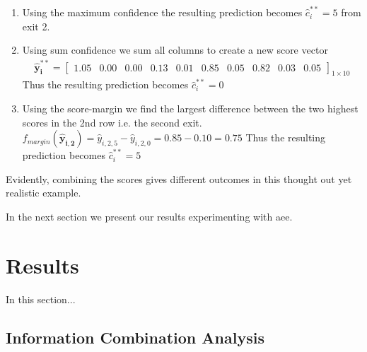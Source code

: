 {\begin{enumerate}
		\item 	Using the maximum confidence the resulting prediction becomes $ \hat{c}^{**}_{i} =  5$ from exit 2.
		\item 	Using sum confidence we sum all columns to create a new score vector
		\begin{align*}
		\bm{\hat{y}^{**}_{i}} = 
		\begin{bmatrix}
		1.05 & 0.00 & 0.00 & 0.13 & 0.01 & 0.85 & 0.05 & 0.82 & 0.03 & 0.05
		\end{bmatrix}_{1 \times 10}
		\end{align*}
		Thus the resulting prediction becomes $ \hat{c}^{**}_{i} = 0$
		\item Using the score-margin we find the largest difference between the two highest scores in the 2nd row i.e. the second exit. $ f_{margin}\left(\bm{\hat{y}_{i,2}}\right) = \hat{y}_{i,2,5} - \hat{y}_{i,2,0} = 0.85 - 0.10 =0.75 $ Thus the resulting prediction becomes $ \hat{c}^{**}_i = 5$
	\end{enumerate}
	Evidently, combining the scores gives different outcomes in this thought out yet realistic example.
	
}

In the next section we present our results experimenting with \gls{aee}.

\section{Results} \label{sec:edge-results}

In this section...

\subsection{Information Combination Analysis}


